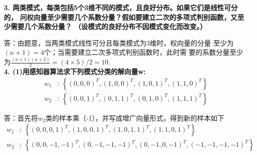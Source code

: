 \documentclass[a4paper, UTF8, 12pt]{ctexart}
\begin{document}
    \newpage
    \textbf{3. 两类模式，每类包括5个3维不同的模式，且良好分布。如果它们是线性可分的，
    问权向量至少需要几个系数分量？假如要建立二次的多项式判别函数，又至少需要几个系数分量？
    （设模式的良好分布不因模式变化而改变。）}

    答：由题意，当两类模式线性可分且每类模式为3维时，权向量的分量
    至少为 $(n+1)=4$个；当需要建立二次多项式判别函数时，此时需
    要的系数分量至少为$\frac{(n+1)(n+2)}{2}=(4\times 5)/2=10.$ \\
    
    \textbf{4. (1)用感知器算法求下列模式分类的解向量w:}
    \begin{equation*}
        \begin{split}
            w_1 &: \ \left\{ {\left(0, 0, 0 \right)}^T, {\left(1, 0, 0\right)}^T, {\left(1, 0, 1\right)}^T,{\left(1, 1, 0\right)}^T \right\}   \\
            w_2 &: \ \left\{{\left(0, 0, 1\right)}^T, {\left(0, 1, 1\right)}^T, {\left(0, 1, 0\right)}^T, {\left(1, 1, 1\right)}^T \right\}
        \end{split}
    \end{equation*} 

    答：首先将$w_2$类的样本乘（-1），并写成增广向量形式，得到新的样本如下
    \begin{equation*}
        \begin{split}
            w_1 &: \ \left\{ {\left(0, 0, 0, 1 \right)}^T, {\left(1, 0, 0, 1\right)}^T, {\left(1, 0, 1, 1\right)}^T,{\left(1, 1, 0, 1\right)}^T \right\}   \\
            w_2 &: \ \left\{{\left(0, 0, -1, -1\right)}^T, {\left(0, -1, -1, -1\right)}^T, {\left(0, -1, 0, -1\right)}^T, {\left(-1, -1, -1, -1\right)}^T \right\}
        \end{split}
    \end{equation*} 
\end{document}
